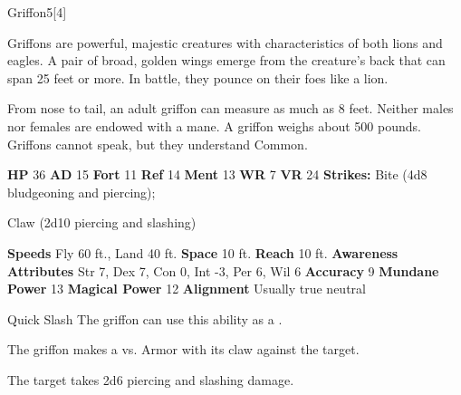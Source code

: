   \begin{monsection}{Griffon}{5}[4]
    \vspace{-1em}\vspace{-1em}
    \vspace{0em}

    
        Griffons are powerful, majestic creatures with characteristics of both lions and eagles.
        A pair of broad, golden wings emerge from the creature’s back that can span 25 feet or more.
        In battle, they pounce on their foes like a lion.
      
        From nose to tail, an adult griffon can measure as much as 8 feet.
        Neither males nor females are endowed with a mane.
        A griffon weighs about 500 pounds.
        Griffons cannot speak, but they understand Common.
      

    \begin{spellcontent}
      \begin{spelltargetinginfo}
        \pari \textbf{HP} 36 \monsep
          \textbf{AD} 15 \monsep
          \textbf{Fort} 11 \monsep
          \textbf{Ref} 14 \monsep
          \textbf{Ment} 13
        \pari \textbf{WR} 7 \monsep
        \textbf{VR} 24
        \pari \textbf{Strikes:}
            Bite  (4d8 bludgeoning and piercing);
\par Claw  (2d10 piercing and slashing)
      \end{spelltargetinginfo}
    \end{spellcontent}
    \begin{monsterfooter}
      \pari \textbf{Speeds} Fly 60 ft., Land 40 ft. \monsep
        \textbf{Space} 10 ft. \monsep
        \textbf{Reach} 10 ft.
      \pari \textbf{Awareness} 
      \pari \textbf{Attributes}
        Str 7, Dex 7,
        Con 0, Int -3,
        Per 6, Wil 6
      \pari \textbf{Accuracy} 9 \monsep
        \textbf{Mundane Power} 13 \monsep
      \textbf{Magical Power} 12
      \pari \textbf{Alignment} Usually true neutral
    \end{monsterfooter}
  \end{monsection}
  \begin{freeability}{Quick Slash}
      The griffon can use this ability as a .\par The griffon makes a 
         vs. Armor
        with its claw against the target.
    
    \hit The target takes 2d6 piercing and slashing damage.
    \end{freeability}
  
